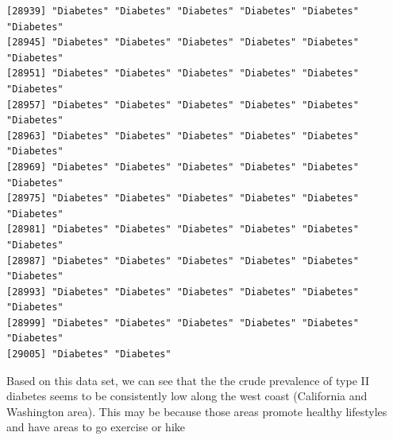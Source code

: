 \documentclass[
  letterpaper,
  DIV=11,
  numbers=noendperiod]{scrartcl}
\begin{document}
\begin{verbatim}
[28939] "Diabetes" "Diabetes" "Diabetes" "Diabetes" "Diabetes" "Diabetes"
[28945] "Diabetes" "Diabetes" "Diabetes" "Diabetes" "Diabetes" "Diabetes"
[28951] "Diabetes" "Diabetes" "Diabetes" "Diabetes" "Diabetes" "Diabetes"
[28957] "Diabetes" "Diabetes" "Diabetes" "Diabetes" "Diabetes" "Diabetes"
[28963] "Diabetes" "Diabetes" "Diabetes" "Diabetes" "Diabetes" "Diabetes"
[28969] "Diabetes" "Diabetes" "Diabetes" "Diabetes" "Diabetes" "Diabetes"
[28975] "Diabetes" "Diabetes" "Diabetes" "Diabetes" "Diabetes" "Diabetes"
[28981] "Diabetes" "Diabetes" "Diabetes" "Diabetes" "Diabetes" "Diabetes"
[28987] "Diabetes" "Diabetes" "Diabetes" "Diabetes" "Diabetes" "Diabetes"
[28993] "Diabetes" "Diabetes" "Diabetes" "Diabetes" "Diabetes" "Diabetes"
[28999] "Diabetes" "Diabetes" "Diabetes" "Diabetes" "Diabetes" "Diabetes"
[29005] "Diabetes" "Diabetes"
\end{verbatim}

Based on this data set, we can see that the the crude prevalence of type
II diabetes seems to be consistently low along the west coast
(California and Washington area). This may be because those areas
promote healthy lifestyles and have areas to go exercise or hike
\end{document}
